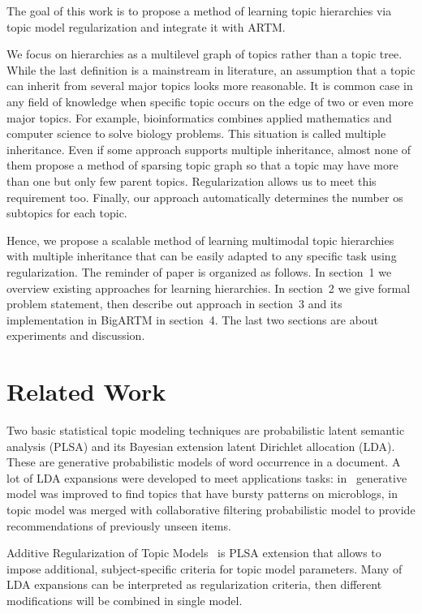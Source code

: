 \documentclass[12pt, twoside]{article}
\begin{document}
The goal of this work is to propose a method of learning topic hierarchies via topic model regularization and integrate it with ARTM. 

We focus on hierarchies as a multilevel graph of topics rather than a topic tree. While the last definition is a mainstream in literature, an assumption that a topic can inherit from several major topics looks more reasonable. 
It is common case in any field of knowledge when specific topic occurs on the edge of two or even more major topics. For example, bioinformatics combines applied mathematics and computer science to solve biology problems. This situation is called multiple inheritance.
Even if some approach supports multiple inheritance, almost none of them propose a method of sparsing topic graph so that a topic may have more than one but only few parent topics. Regularization allows us to meet this requirement too.
Finally, our approach automatically determines the number os subtopics for each topic.

Hence, we propose a scalable method of learning multimodal topic hierarchies with multiple inheritance that can be easily adapted to any specific task using regularization. The reminder of paper is organized as follows. In section~1 we overview existing approaches for learning hierarchies. In section~2 we give formal problem statement, then describe out approach in section~3 and its implementation in BigARTM in section~4. The last two sections are about experiments and discussion.

\section{Related Work}
\label{RelatedWork}
Two basic statistical topic modeling techniques are probabilistic latent semantic analysis (PLSA) and its Bayesian extension latent Dirichlet allocation (LDA). These are generative probabilistic models of word occurrence in a document. A lot of LDA expansions were developed to meet applications tasks: in~\cite{FindingBurstyTopics} generative model was improved to find topics that have bursty patterns on microblogs, in~\cite{CTR} topic model was merged with collaborative filtering probabilistic model to provide recommendations of previously unseen items. 

Additive Regularization of Topic Models~\cite{ARTM} is PLSA extension that allows to impose additional, subject-specific criteria for topic model parameters. Many of LDA expansions can be interpreted as regularization criteria, then different modifications will be combined in single model.
\end{document}
